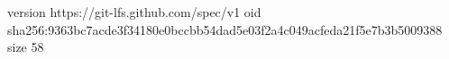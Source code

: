 version https://git-lfs.github.com/spec/v1
oid sha256:9363bc7acde3f34180e0bccbb54dad5e03f2a4c049acfeda21f5e7b3b5009388
size 58

